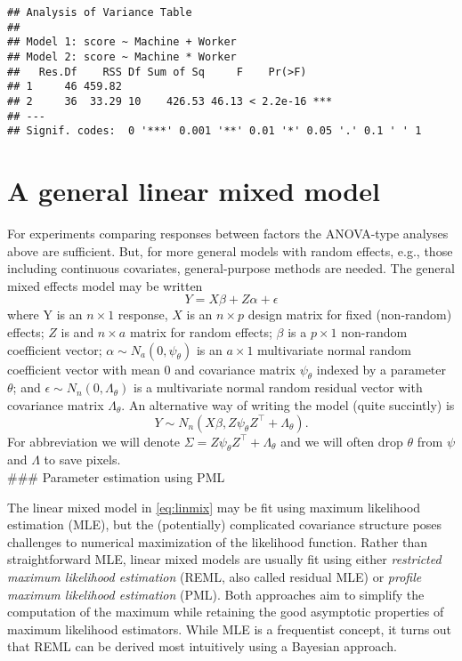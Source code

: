 \documentclass[
]{book}
\begin{document}
\begin{verbatim}
## Analysis of Variance Table
## 
## Model 1: score ~ Machine + Worker
## Model 2: score ~ Machine * Worker
##   Res.Df    RSS Df Sum of Sq     F    Pr(>F)    
## 1     46 459.82                                 
## 2     36  33.29 10    426.53 46.13 < 2.2e-16 ***
## ---
## Signif. codes:  0 '***' 0.001 '**' 0.01 '*' 0.05 '.' 0.1 ' ' 1
\end{verbatim}

\hypertarget{a-general-linear-mixed-model}{%
\section{A general linear mixed model}\label{a-general-linear-mixed-model}}

For experiments comparing responses between factors the ANOVA-type analyses above are sufficient. But, for more general models with random effects, e.g., those including continuous covariates, general-purpose methods are needed. The general mixed effects model may be written
\[Y = X\beta+ Z\alpha + \epsilon\]
where Y is an \(n\times 1\) response, \(X\) is an \(n \times p\) design matrix for fixed (non-random) effects; \(Z\) is and \(n\times a\) matrix for random effects; \(\beta\) is a \(p\times 1\) non-random coefficient vector; \(\alpha\sim N_a(0, \psi_\theta)\) is an \(a\times 1\) multivariate normal random coefficient vector with mean 0 and covariance matrix \(\psi_\theta\) indexed by a parameter \(\theta\); and \(\epsilon\sim N_n(0, \Lambda_\theta)\) is a multivariate normal random residual vector with covariance matrix \(\Lambda_\theta\). An alternative way of writing the model (quite succintly) is
\begin{equation}
\label{eq:linmix}
Y\sim N_n(X\beta, Z \psi_\theta Z^\top + \Lambda_\theta).
\end{equation}
For abbreviation we will denote \(\Sigma = Z \psi_\theta Z^\top + \Lambda_\theta\) and we will often drop \(\theta\) from \(\psi\) and \(\Lambda\) to save pixels.\\
\#\#\# Parameter estimation using PML

The linear mixed model in \eqref{eq:linmix} may be fit using maximum likelihood estimation (MLE), but the (potentially) complicated covariance structure poses challenges to numerical maximization of the likelihood function. Rather than straightforward MLE, linear mixed models are usually fit using either \emph{restricted maximum likelihood estimation} (REML, also called residual MLE) or \emph{profile maximum likelihood estimation} (PML). Both approaches aim to simplify the computation of the maximum while retaining the good asymptotic properties of maximum likelihood estimators. While MLE is a frequentist concept, it turns out that REML can be derived most intuitively using a Bayesian approach.
\end{document}
